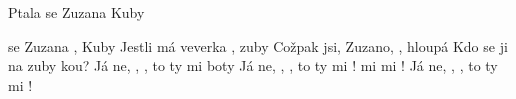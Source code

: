 \begin{TEXT}{Ptala se Zuzana Kuby}

\SLOKA* {} se Zuzana , Kuby\NL
Jestli má veverka , zuby\NL
Cožpak jsi, Zuzano, , hloupá\NL
Kdo se ji na zuby kou?
\SLOKA* Já ne, , , to ty\NL
{} mi  boty\NL
Já ne, , , to ty\NL
{} mi !
\SLOKA* {} mi \NL
{} mi !\NL
Já ne, , , to ty\NL
{} mi !\NL
\end{TEXT}